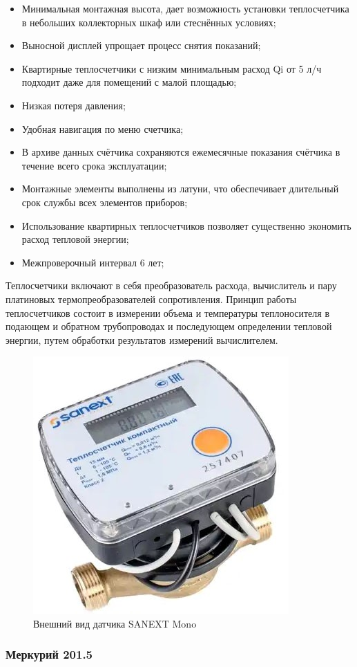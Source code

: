 \begin{itemize}
	\item Минимальная монтажная высота, дает возможность установки теплосчетчика в небольших коллекторных шкаф или стеснённых условиях;
	\item Выносной дисплей упрощает процесс снятия показаний;
	\item Квартирные теплосчетчики с низким минимальным расход Qi от 5 л/ч подходит даже для помещений с малой площадью;
	\item Низкая потеря давления;
	\item Удобная навигация по меню счетчика;
	\item В архиве данных счётчика сохраняются ежемесячные показания счётчика в течение всего срока эксплуатации;
	\item Монтажные элементы выполнены из латуни, что обеспечивает длительный срок службы всех элементов приборов;
	\item Использование квартирных теплосчетчиков позволяет существенно экономить расход тепловой энергии;
	\item Межпроверочный интервал 6 лет;
\end{itemize}

Теплосчетчики включают в себя преобразователь расхода, вычислитель и пару платиновых термопреобразователей сопротивления.
Принцип работы теплосчетчиков состоит в измерении объема и температуры теплоносителя в подающем и обратном трубопроводах и последующем определении тепловой энергии, путем обработки результатов измерений вычислителем.

\begin{figure}[H]
	\centering
	\includegraphics[width=0.4\linewidth]{pics/SANEXT}
	\caption{Внешний вид датчика SANEXT Mono}
	\label{fig:sanext}
\end{figure}

\subsubsection{Меркурий 201.5}

